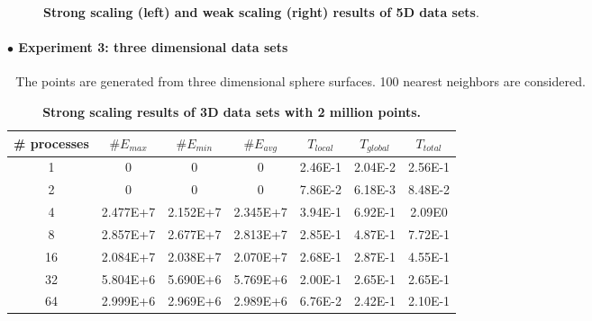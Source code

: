 \documentclass[12pt]{article}
\begin{document}
\begin{appendices}
\begin{figure}[h]
	\caption{\textbf{Strong scaling (left) and weak scaling (right) results of 5D data sets}.}
	\label{5D_nopar}
\end{figure}
\clearpage

\paragraph{$\bullet$ Experiment 3: three dimensional data sets}
$ $\newline
$ $\newline
\indent The points are generated from three dimensional sphere surfaces. 100 nearest neighbors are considered.
$ $\newline
\renewcommand{\arraystretch}{1.7}
\begin{table}[h]
\centering
    \caption{\textbf{Strong scaling results of 3D data sets with 2 million points.} }
	\label{2M3D_nopar}
\begin{tabular}{ccccccc}
    \hline %
\# processes  &$\# E_{max}$   &$\# E_{min}$ &$\# E_{avg}$  &$T_{local}$  &$T_{global}$  &$T_{total}$\\
\hline\hline
1  &0  &0  &0  &2.46E-1   &2.04E-2   &2.56E-1 \\
2  &0  &0  &0   &7.86E-2 &6.18E-3  &8.48E-2 \\
4   &2.477E+7   &2.152E+7   &2.345E+7  &3.94E-1   &6.92E-1 &2.09E0 \\
8  &2.857E+7   &2.677E+7   &2.813E+7   &2.85E-1   &4.87E-1 &7.72E-1 \\
16 &2.084E+7   &2.038E+7   &2.070E+7   &2.68E-1   &2.87E-1  &4.55E-1 \\
32  &5.804E+6   &5.690E+6   &5.769E+6   &2.00E-1   &2.65E-1 &2.65E-1 \\
64   &2.999E+6   &2.969E+6   &2.989E+6  &6.76E-2   &2.42E-1 &2.10E-1 \\
\hline
    \end{tabular}
\end{table}


\end{appendices}
\end{document}
